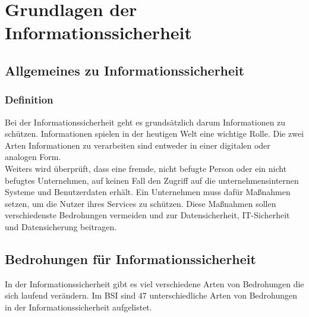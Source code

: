 \chapter{Grundlagen der Informationssicherheit}
\strahlhofer

\section{Allgemeines zu Informationssicherheit}
\subsection{Definition}
Bei der Informationssicherheit geht es grundsätzlich darum Informationen zu schützen. Informationen spielen in der heutigen Welt eine wichtige Rolle. Die zwei Arten Informationen zu verarbeiten sind entweder in einer digitalen oder analogen Form. 
\\
Weiters wird überprüft, dass eine fremde, nicht befugte Person oder ein nicht befugtes Unternehmen, auf keinen Fall den Zugriff auf die unternehmensinternen Systeme und Benutzerdaten erhält. Ein Unternehmen muss dafür Maßnahmen setzen, um die Nutzer ihres Services zu schützen. Diese Maßnahmen sollen verschiedenste Bedrohungen vermeiden und zur Datensicherheit, IT-Sicherheit und Datensicherung beitragen.
\\

\section{Bedrohungen für Informationssicherheit}
In der Informationssicherheit gibt es viel verschiedene Arten von Bedrohungen die sich laufend verändern. Im BSI sind 47 unterschiedliche Arten von Bedrohungen in der Informationssicherheit aufgelistet.

